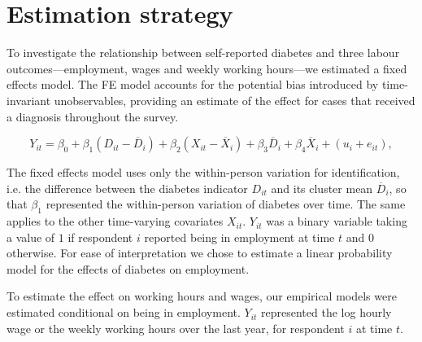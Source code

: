 \documentclass[12pt,english]{article}
\begin{document}

\section{\label{sec:Estimation Strategy}Estimation strategy}

To investigate the relationship between self-reported diabetes and three labour outcomes---employment, wages and weekly working hours---we estimated a fixed effects model. The \ac{FE} model accounts for the potential bias introduced by time-invariant unobservables, providing an estimate of the effect for cases that received a diagnosis throughout the survey.


\begin{equation}
Y_{it}=\beta_{0}+\beta_{1}(D_{it}-\overline{D}_{i})+\beta_{2}(X_{it}-\overline{X}_i)+\beta_{3}\overline{D}_{i}+\beta_{4}\overline{X}_i+(u_{i}+e_{it}),\label{eq:cha4_employed}
\end{equation}

The fixed effects model uses only the  within-person variation for identification, i.e. the difference between the diabetes indicator $D_{it}$ and its cluster mean $\overline{D}_{i}$, so that $\beta_{1}$ represented the within-person variation of diabetes over time. The same applies to the other time-varying covariates $X_{it}$. $Y_{it}$ was a binary variable taking a value of $1$ if respondent $i$ reported being in employment at time $t$ and $0$ otherwise. For ease of interpretation we chose to estimate a linear probability model for the effects of diabetes on employment.

To estimate the effect on working hours and wages, our empirical models were estimated conditional on being in employment. $Y_{it}$ represented the log hourly wage or the weekly working hours over the last year, for respondent $i$ at time $t$.
\end{document}
